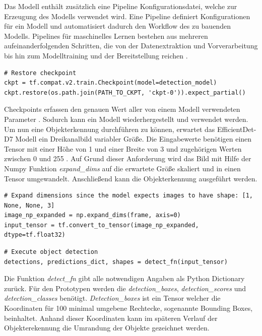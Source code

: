 Das Modell enthält zusätzlich eine Pipeline Konfigurationsdatei, welche zur Erzeugung des Modells verwendet wird. Eine Pipeline definiert Konfigurationen für ein Modell und automatisiert dadurch den Workflow des zu bauenden Modells. Pipelines für maschinelles Lernen bestehen aus mehreren aufeinanderfolgenden Schritten, die von der Datenextraktion und Vorverarbeitung bis hin zum Modelltraining und der Bereitstellung reichen \cite{valohai}.

\vspace*{10mm}
\begin{lstlisting}[caption={Laden der Checkpoints}, label={lst:checkpoints}]
# Restore checkpoint
ckpt = tf.compat.v2.train.Checkpoint(model=detection_model)
ckpt.restore(os.path.join(PATH_TO_CKPT, 'ckpt-0')).expect_partial()
\end{lstlisting}

Checkpoints erfassen den genauen Wert aller von einem Modell verwendeten Parameter \cite{tf_checkpoint}. Sodurch kann ein Modell wiederhergestellt und verwendet werden. Um nun eine Objekterkennung durchführen zu können, erwartet das EfficientDet-D7 Modell ein Dreikanalbild variabler Größe. Die Eingabewerte benötigen einen Tensor mit einer Höhe von 1 und einer Breite von 3 und zugehörigen Werten zwischen 0 und 255 \cite{efficientdet}. Auf Grund dieser Anforderung wird das Bild mit Hilfe der \gls{Numpy} Funktion \emph{expand\_dims} auf die erwartete Größe skaliert und in einen Tensor umgewandelt. Anschließend kann die Objekterkennung ausgeführt werden.

\vspace*{10mm}
\begin{lstlisting}[caption={Anpassung des Eingabetensors an das Modell}, label={lst:tensorfit}]
# Expand dimensions since the model expects images to have shape: [1, None, None, 3]
image_np_expanded = np.expand_dims(frame, axis=0)
input_tensor = tf.convert_to_tensor(image_np_expanded, dtype=tf.float32)
\end{lstlisting}

\begin{lstlisting}[caption={Ausführung der Objekterkennung}, label={lst:objectdetection_execution}]
# Execute object detection
detections, predictions_dict, shapes = detect_fn(input_tensor)
\end{lstlisting}

Die Funktion \emph{detect\_fn} gibt alle notwendigen Angaben als Python Dictionary zurück. Für den Prototypen werden die \emph{detection\_boxes}, \emph{detection\_scores} und \emph{detection\_classes} benötigt. \emph{Detection\_boxes} ist ein Tensor welcher die Koordinaten für 100 minimal umgebene Rechtecke, sogenannte Bounding Boxes, beinhaltet. Anhand dieser Koordinaten kann im späteren Verlauf der Objekterekennung die Umrandung der Objekte gezeichnet werden. 
 
